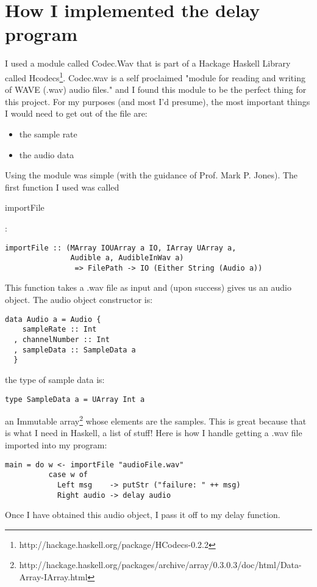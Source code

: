 \documentclass[12pt]{article}
\begin{document}
\section{How I implemented the delay program}
I used a module called Codec.Wav that is part of a Hackage Haskell Library called Hcodecs\footnote{http://hackage.haskell.org/package/HCodecs-0.2.2}. Codec.wav is a self proclaimed "module for reading and writing of WAVE (.wav) audio files." and I found this module to be the perfect thing for this project. For my purposes (and most I'd presume), the most important things I would need to get out of the file are:
\begin{itemize}
\item the sample rate
\item the audio data
\end{itemize}
Using the module was simple (with the guidance of Prof. Mark P. Jones). The first function I used was called \begin{tt}importFile\end{tt}:
\begin{verbatim}
importFile :: (MArray IOUArray a IO, IArray UArray a, 
               Audible a, AudibleInWav a)
                => FilePath -> IO (Either String (Audio a))
\end{verbatim}
This function takes a .wav file as input and (upon success) gives us an audio
object. The audio object constructor is:
\begin{verbatim}
data Audio a = Audio {
    sampleRate :: Int
  , channelNumber :: Int
  , sampleData :: SampleData a
  }
\end{verbatim}
the type of sample data is:
\begin{verbatim}
type SampleData a = UArray Int a
\end{verbatim}
an Immutable array\footnote{http://hackage.haskell.org/packages/archive/array/0.3.0.3/doc/html/Data-Array-IArray.html} whose elements are the samples. This is great because that is what I need in Haskell, a list of stuff! Here is how I handle getting a .wav file imported into my program:
\begin{verbatim}
main = do w <- importFile "audioFile.wav" 
          case w of
            Left msg    -> putStr ("failure: " ++ msg)
            Right audio -> delay audio
\end{verbatim}
Once I have obtained this audio object, I pass it off to my delay function.
\end{document}
